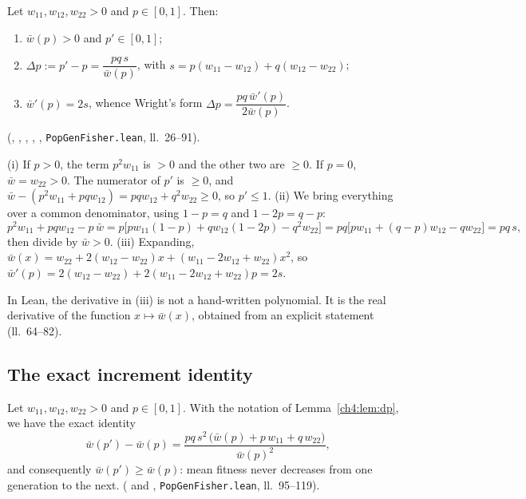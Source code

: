 \begin{lemma}\label{ch4:lem:dp}
Let $w_{11},w_{12},w_{22}>0$ and $p\in[0,1]$. Then:
\begin{enumerate}[label=(\roman*),itemsep=1pt]
\item $\bar w(p)>0$ and $p'\in[0,1]$;
\item $\Delta p:=p'-p=\dfrac{pq\,s}{\bar w(p)}$, with $s=p(w_{11}-w_{12})+q(w_{12}-w_{22})$;
\item $\bar w'(p)=2s$, whence Wright's form $\Delta p=\dfrac{pq\,\bar w'(p)}{2\bar w(p)}$.
\end{enumerate}
\tierA{} (, , , ,
, \texttt{PopGenFisher.lean}, ll.~26--91).
\end{lemma}

\begin{humanproof}
(i) If $p>0$, the term $p^2w_{11}$ is $>0$ and the other two are $\ge0$. If $p=0$, $\bar w=w_{22}>0$. The
numerator of $p'$ is $\ge0$, and $\bar w-(p^2w_{11}+pqw_{12})=pqw_{12}+q^2w_{22}\ge0$, so $p'\le1$.
(ii) We bring everything over a common denominator, using $1-p=q$ and $1-2p=q-p$:
\[
p^2w_{11}+pqw_{12}-p\,\bar w
=p\bigl[pw_{11}(1-p)+qw_{12}(1-2p)-q^2w_{22}\bigr]
=pq\bigl[pw_{11}+(q-p)w_{12}-qw_{22}\bigr]=pq\,s ,
\]
then divide by $\bar w>0$.
(iii) Expanding, $\bar w(x)=w_{22}+2(w_{12}-w_{22})x+(w_{11}-2w_{12}+w_{22})x^2$, so
$\bar w'(p)=2(w_{12}-w_{22})+2(w_{11}-2w_{12}+w_{22})p=2s$.
\end{humanproof}

In Lean, the derivative in (iii) is not a hand-written polynomial. It is the real derivative  of the
function $x\mapsto\bar w(x)$, obtained from an explicit  statement (ll.~64--82).

\subsection{The exact increment identity}

\begin{theorem}\label{ch4:thm:wbar}
Let $w_{11},w_{12},w_{22}>0$ and $p\in[0,1]$. With the notation of Lemma~\ref{ch4:lem:dp}, we have the exact
identity
\begin{equation}\label{ch4:eq:increment}
\bar w(p')-\bar w(p)=\frac{pq\,s^2\,\bigl(\bar w(p)+p\,w_{11}+q\,w_{22}\bigr)}{\bar w(p)^2},
\end{equation}
and consequently $\bar w(p')\ge\bar w(p)$: mean fitness never decreases from one generation to the
next. \tierA{} ( and ,
\texttt{PopGenFisher.lean}, ll.~95--119).
\end{theorem}

